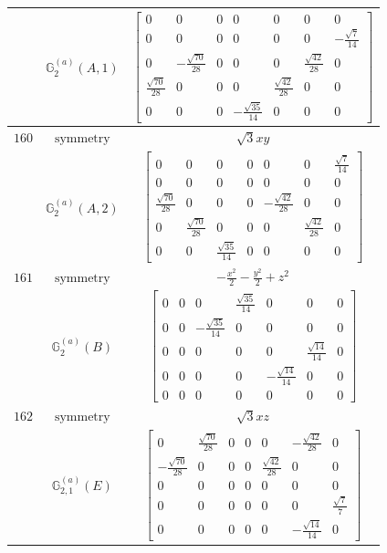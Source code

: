 \documentclass[fleqn,8pt,landscape]{jsarticle}
\begin{document}
\begin{longtable}{ccc}
$  $ & $ \mathbb{G}_{2}^{(a)}(A,1) $ & $ \begin{bmatrix} 0 & 0 & 0 & 0 & 0 & 0 & 0 \\ 0 & 0 & 0 & 0 & 0 & 0 & - \frac{\sqrt{7}}{14} \\ 0 & - \frac{\sqrt{70}}{28} & 0 & 0 & 0 & \frac{\sqrt{42}}{28} & 0 \\ \frac{\sqrt{70}}{28} & 0 & 0 & 0 & \frac{\sqrt{42}}{28} & 0 & 0 \\ 0 & 0 & 0 & - \frac{\sqrt{35}}{14} & 0 & 0 & 0 \end{bmatrix} $ \\ \hline
$ 160 $ & $ \text{symmetry} $ & $ \sqrt{3} x y $ \\
$  $ & $ \mathbb{G}_{2}^{(a)}(A,2) $ & $ \begin{bmatrix} 0 & 0 & 0 & 0 & 0 & 0 & \frac{\sqrt{7}}{14} \\ 0 & 0 & 0 & 0 & 0 & 0 & 0 \\ \frac{\sqrt{70}}{28} & 0 & 0 & 0 & - \frac{\sqrt{42}}{28} & 0 & 0 \\ 0 & \frac{\sqrt{70}}{28} & 0 & 0 & 0 & \frac{\sqrt{42}}{28} & 0 \\ 0 & 0 & \frac{\sqrt{35}}{14} & 0 & 0 & 0 & 0 \end{bmatrix} $ \\ \hline
$ 161 $ & $ \text{symmetry} $ & $ - \frac{x^{2}}{2} - \frac{y^{2}}{2} + z^{2} $ \\
$  $ & $ \mathbb{G}_{2}^{(a)}(B) $ & $ \begin{bmatrix} 0 & 0 & 0 & \frac{\sqrt{35}}{14} & 0 & 0 & 0 \\ 0 & 0 & - \frac{\sqrt{35}}{14} & 0 & 0 & 0 & 0 \\ 0 & 0 & 0 & 0 & 0 & \frac{\sqrt{14}}{14} & 0 \\ 0 & 0 & 0 & 0 & - \frac{\sqrt{14}}{14} & 0 & 0 \\ 0 & 0 & 0 & 0 & 0 & 0 & 0 \end{bmatrix} $ \\ \hline
$ 162 $ & $ \text{symmetry} $ & $ \sqrt{3} x z $ \\
$  $ & $ \mathbb{G}_{2,1}^{(a)}(E) $ & $ \begin{bmatrix} 0 & \frac{\sqrt{70}}{28} & 0 & 0 & 0 & - \frac{\sqrt{42}}{28} & 0 \\ - \frac{\sqrt{70}}{28} & 0 & 0 & 0 & \frac{\sqrt{42}}{28} & 0 & 0 \\ 0 & 0 & 0 & 0 & 0 & 0 & 0 \\ 0 & 0 & 0 & 0 & 0 & 0 & \frac{\sqrt{7}}{7} \\ 0 & 0 & 0 & 0 & 0 & - \frac{\sqrt{14}}{14} & 0 \end{bmatrix} $ \\ \hline

\end{longtable}
\end{document}
